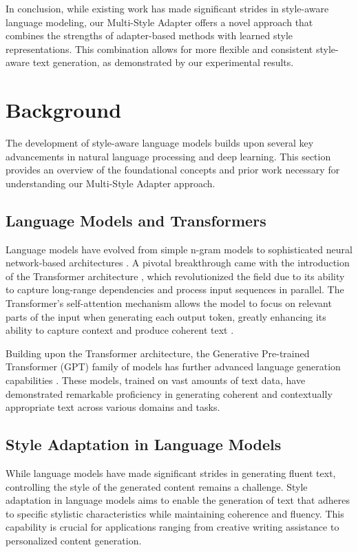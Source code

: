 \documentclass{article} %
\begin{document}
In conclusion, while existing work has made significant strides in style-aware language modeling, our Multi-Style Adapter offers a novel approach that combines the strengths of adapter-based methods with learned style representations. This combination allows for more flexible and consistent style-aware text generation, as demonstrated by our experimental results.

\section{Background}
\label{sec:background}

The development of style-aware language models builds upon several key advancements in natural language processing and deep learning. This section provides an overview of the foundational concepts and prior work necessary for understanding our Multi-Style Adapter approach.

\subsection{Language Models and Transformers}

Language models have evolved from simple n-gram models to sophisticated neural network-based architectures \cite{goodfellow2016deep}. A pivotal breakthrough came with the introduction of the Transformer architecture \cite{vaswani2017attention}, which revolutionized the field due to its ability to capture long-range dependencies and process input sequences in parallel. The Transformer's self-attention mechanism allows the model to focus on relevant parts of the input when generating each output token, greatly enhancing its ability to capture context and produce coherent text \cite{bahdanau2014neural}.

Building upon the Transformer architecture, the Generative Pre-trained Transformer (GPT) family of models has further advanced language generation capabilities \cite{radford2019language}. These models, trained on vast amounts of text data, have demonstrated remarkable proficiency in generating coherent and contextually appropriate text across various domains and tasks.

\subsection{Style Adaptation in Language Models}

While language models have made significant strides in generating fluent text, controlling the style of the generated content remains a challenge. Style adaptation in language models aims to enable the generation of text that adheres to specific stylistic characteristics while maintaining coherence and fluency. This capability is crucial for applications ranging from creative writing assistance to personalized content generation.
\end{document}
